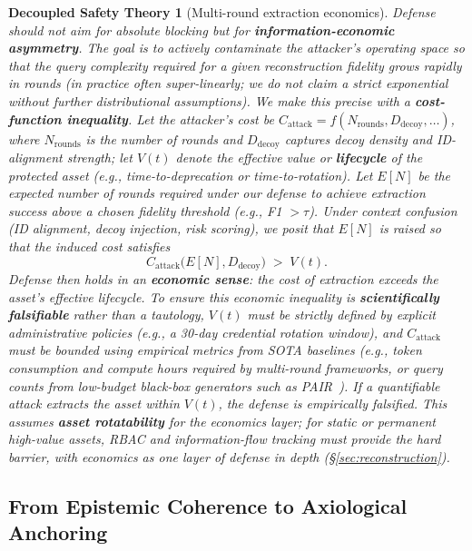 \documentclass[letterpaper,twocolumn,10pt]{article}
\newtheorem{definition}[theorem]{Decoupled Safety Theory}
\begin{document}
\begin{definition}[Multi-round extraction economics]
Defense should not aim for absolute blocking but for \textbf{information-economic asymmetry}. The goal is to \emph{actively contaminate the attacker's operating space} so that the \emph{query complexity} required for a given reconstruction fidelity grows rapidly in rounds (in practice often super-linearly; we do not claim a strict exponential without further distributional assumptions). We make this precise with a \textbf{cost-function inequality}. Let the attacker's cost be $C_{\mathrm{attack}} = f(N_{\mathrm{rounds}}, D_{\mathrm{decoy}}, \ldots)$, where $N_{\mathrm{rounds}}$ is the number of rounds and $D_{\mathrm{decoy}}$ captures decoy density and ID-alignment strength; let $V(t)$ denote the effective value or \textbf{lifecycle} of the protected asset (e.g., time-to-deprecation or time-to-rotation). Let $E[N]$ be the \emph{expected number of rounds} required under our defense to achieve extraction success above a chosen fidelity threshold (e.g., F1 $> \tau$). Under context confusion (ID alignment, decoy injection, risk scoring), we posit that $E[N]$ is \emph{raised} so that the induced cost satisfies
\begin{equation}
C_{\mathrm{attack}}\bigl(E[N], D_{\mathrm{decoy}}\bigr) \;>\; V(t).
\end{equation}
Defense then holds in an \textbf{economic sense}: the cost of extraction exceeds the asset's effective lifecycle. To ensure this economic inequality is \textbf{scientifically falsifiable} rather than a tautology, $V(t)$ must be strictly defined by explicit administrative policies (e.g., a 30-day credential rotation window), and $C_{\mathrm{attack}}$ must be bounded using empirical metrics from SOTA baselines (e.g., token consumption and compute hours required by multi-round frameworks, or query counts from low-budget black-box generators such as PAIR~\cite{pair-jailbreak}). If a quantifiable attack extracts the asset within $V(t)$, the defense is empirically falsified. This assumes \textbf{asset rotatability} for the economics layer; for static or permanent high-value assets, RBAC and information-flow tracking must provide the hard barrier, with economics as one layer of defense in depth (\S\ref{sec:reconstruction}).
\end{definition}

\subsection{From Epistemic Coherence to Axiological Anchoring}
\label{sec:paradigm-axiological}
\end{document}

